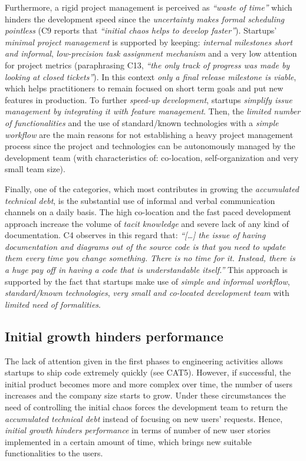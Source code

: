 \documentclass[10pt,journal,letterpaper,compsoc]{IEEEtran}
\begin{document}
Furthermore, a rigid project management is perceived as \textit{``waste of 
time''} which hinders the development speed since the \textit{uncertainty makes 
formal scheduling pointless} (C9  reports that \textit{``initial chaos helps to 
develop faster''}). Startups' \textit{minimal project management}  is supported 
by keeping: \textit{internal milestones short and informal}, 
\textit{low-precision task assignment mechanism}  and a very low attention for 
project metrics (paraphrasing C13, \textit{``the only track of progress was made 
by looking at closed tickets''}). In this context \textit{only a final release 
milestone is viable}, which helps practitioners to remain focused on short term 
goals and put new features in production. To further \textit{speed-up 
development}, startups \textit{simplify issue management by integrating it with 
feature management}. Then, the \textit{limited number of functionalities} and 
the {use of standard/known technologies} with a \textit{simple workflow} are the 
main reasons for 
not establishing a heavy project management process since the project and 
technologies can be autonomously managed by the development team (with 
characteristics of: co-location, self-organization and very small team size). %

Finally, one of the categories, which most contributes in growing the 
\textit{accumulated technical debt}, is the substantial  use of informal and 
verbal communication channels on a daily basis. The high co-location and the 
fast paced development approach increase the volume of \textit{tacit knowledge} 
and severe lack of any kind of documentation.  C4 observes in this regard that:  
\textit{``[\ldots] the issue of having documentation and diagrams out of the 
source code is that you need to update them every time you change something. 
There is no time for it. Instead, there is a huge pay off in having a code that 
is understandable itself.''}
This approach is supported by the fact that startups make use of  
\textit{simple and informal workflow}, \textit{standard/known technologies}, 
\textit{very small and co-located development team} with \textit{limited need of 
formalities}.
\subsection{Initial growth hinders performance}
\label{res:gsm:cat6}
The lack of attention given in the first phases to engineering activities 
allows startups to ship code extremely quickly (see CAT5). However, if 
successful, the initial product becomes more and more complex over time, the 
number of users increases and the company size starts to grow. Under these 
circumstances the need of controlling the initial chaos forces the development 
team to return the \textit{accumulated technical debt} instead of focusing on 
new users' requests. Hence, \textit{initial growth hinders performance} in terms 
of number of new user stories implemented in a certain amount of time, which 
brings new suitable functionalities to the users.
\end{document}
